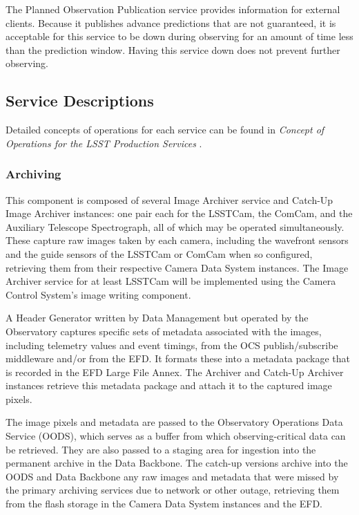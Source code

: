 \documentclass[DM,toc,lsstdraft]{lsstdoc}
\begin{document}
The Planned Observation Publication service provides information for external clients.
Because it publishes advance predictions that are not guaranteed, it is acceptable for this service to be down during observing for an amount of time less than the prediction window.
Having this service down does not prevent further observing.

\subsection{Service Descriptions}\label{base-service-descriptions}

Detailed concepts of operations for each service can be found in
\textit{Concept of Operations for the LSST Production Services} .


\subsubsection{Archiving}\label{archiving}

This component is composed of several Image Archiver service and
Catch-Up Image Archiver instances: one pair each for the LSSTCam, the
ComCam, and the Auxiliary Telescope Spectrograph, all of which may be
operated simultaneously. These capture raw images taken by each camera,
including the wavefront sensors and the guide sensors of the LSSTCam or
ComCam when so configured, retrieving them from their respective Camera
Data System instances.
The Image Archiver service for at least LSSTCam will be implemented using the Camera Control System's image writing component.

A Header Generator written by Data Management but operated by the Observatory captures specific sets of metadata
associated with the images, including telemetry values and event
timings, from the OCS publish/subscribe middleware and/or from the EFD.
It formats these into a metadata package that is recorded in the EFD Large File Annex.
The Archiver and Catch-Up Archiver instances retrieve this metadata package and attach it to the captured image pixels.

The image pixels and metadata are passed to the Observatory Operations Data Service (OODS), which serves as a buffer from which observing-critical data can be retrieved.
They are also passed to a staging area for ingestion into the permanent archive in the Data Backbone.
The catch-up versions archive into the OODS and Data Backbone any raw
images and metadata that were missed by the primary archiving services
due to network or other outage, retrieving them from the flash storage
in the Camera Data System instances and the EFD.
\end{document}
